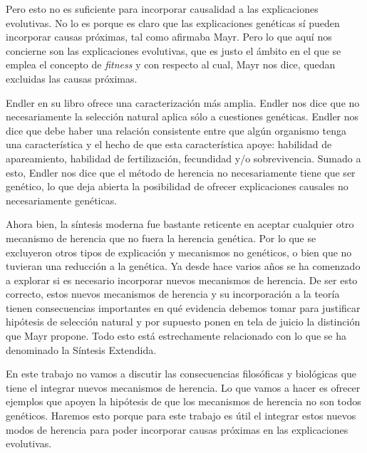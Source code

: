 Pero esto no es suficiente para incorporar causalidad a las explicaciones evolutivas. No lo es porque es claro que las
explicaciones genéticas sí pueden incorporar causas próximas, tal como afirmaba Mayr. Pero lo que aquí nos concierne son las
explicaciones evolutivas, que es justo el ámbito en el que se emplea el concepto de \emph{fitness} y con respecto al cual, Mayr nos dice, quedan excluidas las causas próximas.

Endler en su libro \cite{Endler1986} ofrece una caracterización más amplia. Endler nos dice que no necesariamente la selección
natural aplica sólo a cuestiones genéticas. Endler nos dice que debe haber una relación consistente entre que algún organismo
tenga una característica y el hecho de que esta característica apoye:
habilidad de apareamiento, habilidad de fertilización, fecundidad y/o sobrevivencia. Sumado a esto, Endler nos dice que el método
de herencia no necesariamente tiene que ser genético, lo que deja abierta la posibilidad de ofrecer explicaciones causales no
necesariamente genéticas.

Ahora bien, la síntesis moderna fue bastante reticente en aceptar cualquier otro mecanismo de herencia que no fuera la herencia genética. Por lo que se excluyeron otros tipos de explicación y mecanismos no genéticos, o bien que no tuvieran una reducción a la genética. Ya desde hace varios años se ha comenzado a explorar si es necesario incorporar nuevos mecanismos de herencia. De ser esto correcto, estos nuevos mecanismos de herencia y su incorporación a la teoría tienen consecuencias importantes en qué evidencia debemos tomar para justificar hipótesis de selección natural y por supuesto ponen en tela de juicio la distinción que Mayr propone. Todo esto está estrechamente relacionado con lo que se ha denominado la Síntesis Extendida.

En este trabajo no vamos a discutir las consecuencias filosóficas y biológicas que tiene el integrar nuevos mecanismos de herencia. Lo que vamos a hacer es ofrecer ejemplos que apoyen la hipótesis de que los mecanismos de herencia no son todos genéticos. Haremos esto porque para este trabajo es útil el integrar estos nuevos modos de herencia para poder incorporar causas próximas en las explicaciones evolutivas.

